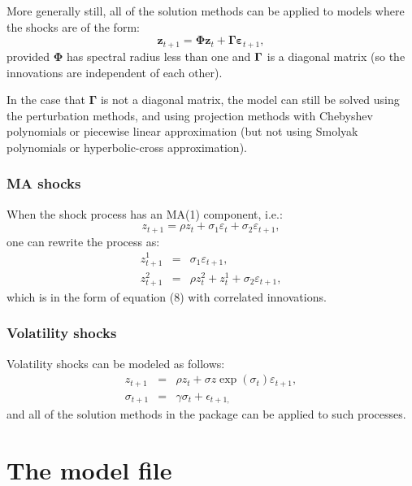 \documentclass[notitlepage,11pt]{article}
\begin{document}
More generally still, all of the solution methods can be applied to models
where the shocks are of the form:%
\begin{equation}
\mathbf{z}_{t+1}=\mathbf{\Phi z}_{t}+\mathbf{\Gamma \varepsilon }_{t+1},
\label{8}
\end{equation}%
provided $\mathbf{\Phi }$ has spectral radius less than one and $\mathbf{%
\Gamma }$ is a diagonal matrix (so the innovations are independent of each
other).

In the case that $\mathbf{\Gamma }$ is not a diagonal matrix, the model can
still be solved using the perturbation methods, and using projection methods
with Chebyshev polynomials or piecewise linear approximation (but not using
Smolyak polynomials or hyperbolic-cross approximation).

\subsubsection{MA shocks}

When the shock process has an MA(1) component, i.e.:%
\begin{equation*}
z_{t+1}=\rho z_{t}+\sigma _{1}\varepsilon _{t}+\sigma _{2}\varepsilon _{t+1},
\end{equation*}%
one can rewrite the process as:%
\begin{eqnarray*}
z_{t+1}^{1} &=&\sigma _{1}\varepsilon _{t+1}, \\
z_{t+1}^{2} &=&\rho z_{t}^{2}+z_{t}^{1}+\sigma _{2}\varepsilon _{t+1},
\end{eqnarray*}%
which is in the form of equation (8) with correlated innovations.

\subsubsection{Volatility shocks}

Volatility shocks can be modeled as follows:%
\begin{eqnarray*}
z_{t+1} &=&\rho z_{t}+\sigma z\exp (\sigma _{t})\varepsilon _{t+1}, \\
\sigma _{t+1} &=&\gamma \sigma _{t}+\epsilon _{t+1,}
\end{eqnarray*}%
and all of the solution methods in the package can be applied to such
processes.

\section{The model file}
\end{document}
